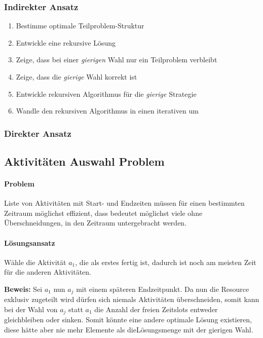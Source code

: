 \documentclass[10pt,a4paper]{article}
\begin{document}
\begin{multicols*}{4}
\subsubsection*{Indirekter Ansatz}
\begin{enumerate}
	\item Bestimme optimale Teilproblem-Struktur
	\item Entwickle eine rekursive Lösung
	\item Zeige, dass bei einer \emph{gierigen} Wahl nur ein Teilproblem verbleibt
	\item Zeige, dass die \emph{gierige} Wahl korrekt ist
	\item Entwickle rekursiven Algorithmus für die \emph{gierige} Strategie
	\item Wandle den rekursiven Algorithmus in einen iterativen um
\end{enumerate}

\subsubsection*{Direkter Ansatz}

\subsection{Aktivitäten Auswahl Problem}

\paragraph{Problem}
Liste von Aktivitäten mit Start- und Endzeiten müssen für einen bestimmten Zeitraum möglichst effizient, dass bedeutet
möglichst viele ohne Überschneidungen, in den Zeitraum untergebracht werden.

\paragraph{Lösungsansatz}
Wähle die Aktivität \(a_{1}\), die als erstes fertig ist, dadurch ist noch am meisten Zeit für die anderen Aktivitäten.

\textbf{Beweis:} Sei \(a_{1}\) nun \(a_{j}\) mit einem späteren Endzeitpunkt. Da nun die Resource exklusiv zugeteilt
wird dürfen sich niemals Aktivitäten überschneiden, somit kann bei der Wahl von \(a_{j}\) statt \(a_{1}\) die Anzahl
der freien Zeitslots entweder gleichbleiben oder sinken. Somit könnte eine andere optimale Lösung existieren, diese
hätte aber nie mehr Elemente als dieLösungsmenge mit der gierigen Wahl.


\end{multicols*}
\end{document}
